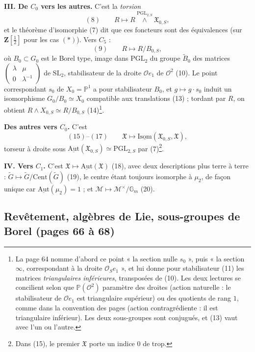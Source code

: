\documentclass[11pt,a4paper]{article}
\begin{document}
\textbf{III. De $C_0$ vers les autres.} C'est la \emph{torsion}
\[
  (8) \qquad R \longmapsto R \overset{\mathrm{PGL}_{2,S}}{\wedge} \mathfrak{X}_{0,S} ,
\]
et le théorème d'isomorphie (7) dit que ces foncteurs sont des équivalences (sur
$\mathbf{Z}[\tfrac{1}{2}]$ pour les cas $(*)$). Vers $C_5$ :
\[
  (9) \qquad R \longmapsto R/B_{0,S} ,
\]
où $B_0 \subset G_0$ est le Borel type, image dans $\mathrm{PGL}_2$ du groupe
$\widetilde{B}_0$ des matrices $\begin{pmatrix} \lambda & \mu \\ 0 & \lambda^{-1} \end{pmatrix}$
de $\mathrm{SL}_2$, stabilisateur de la droite $\mathcal{O} e_1$ de $\mathcal{O}^2$ (10). Le
point correspondant $s_0$ de $X_0 = \mathbb{P}^1$ a pour stabilisateur $B_0$, et
$g \mapsto g\cdot s_0$ induit un isomorphisme $G_0/B_0 \simeq X_0$ compatible aux
translations (13) ; tordant par $R$, on obtient
$R \wedge X_{0,S} \simeq R/B_{0,S}$ (14)\footnote{La page 64 nomme d'abord ce point
« la section nulle $s_0$ », puis « la section $\infty$, correspondant à la droite
$\mathcal{O}_S e_1$ », et lui donne pour stabilisateur (11) les matrices
\emph{triangulaires inférieures}, transposées de (10). Les deux lectures se
concilient selon que $\mathbb{P}(\mathcal{O}^2)$ paramètre des droites (action naturelle :
le stabilisateur de $\mathcal{O} e_1$ est triangulaire supérieur) ou des quotients de
rang $1$, comme dans la convention des pages (action contragrédiente : il est
triangulaire inférieur). Les deux sous-groupes sont conjugués, et (13) vaut avec
l'un ou l'autre.}.

\textbf{Des autres vers $C_0$.} C'est
\[
  (15)\text{--}(17) \qquad \mathfrak{X} \longmapsto \underline{\mathrm{Isom}}(\mathfrak{X}_{0,S}, \mathfrak{X}) ,
\]
torseur à droite sous $\underline{\mathrm{Aut}}(\mathfrak{X}_{0,S}) \simeq \mathrm{PGL}_{2,S}$ par
(7)\footnote{Dans (15), le premier $\mathfrak{X}$ porte un indice $0$ de trop.}.

\textbf{IV. Vers $C_1$.} C'est $\mathfrak{X} \mapsto \underline{\mathrm{Aut}}(\mathfrak{X})$ (18),
avec deux descriptions plus terre à terre : $\widetilde{G} \mapsto
\widetilde{G}/\mathrm{Cent}(\widetilde{G})$ (19), le centre étant toujours isomorphe à
$\mu_2$, de façon unique car $\underline{\mathrm{Aut}}(\mu_2) = 1$ ; et
$\mathcal{M} \mapsto \mathcal{M}^{\times}/\mathbb{G}_m$ (20).

\subsection*{Revêtement, algèbres de Lie, sous-groupes de Borel (pages 66 à 68)}
\end{document}
